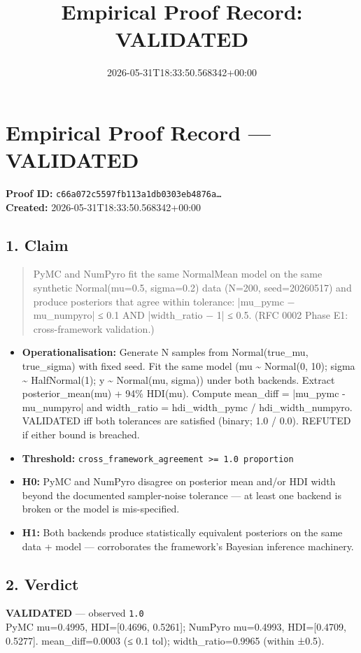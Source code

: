 \documentclass{article}
\title{Empirical Proof Record: VALIDATED}
\date{2026-05-31T18:33:50.568342+00:00}
\begin{document}
\maketitle
\section*{Empirical Proof Record --- \textcolor{validated}{\textbf{VALIDATED}}}
\textbf{Proof ID:} \texttt{c66a072c5597fb113a1db0303eb4876a\dots}\\
\textbf{Created:} 2026-05-31T18:33:50.568342+00:00
\subsection*{1. Claim}
\begin{quote}PyMC and NumPyro fit the same NormalMean model on the same synthetic Normal(mu=0.5, sigma=0.2) data (N=200, seed=20260517) and produce posteriors that agree within tolerance: |mu\_pymc − mu\_numpyro| ≤ 0.1 AND |width\_ratio − 1| ≤ 0.5. (RFC 0002 Phase E1: cross-framework validation.)\end{quote}
\begin{itemize}
\item \textbf{Operationalisation:} Generate N samples from Normal(true\_mu, true\_sigma) with fixed seed. Fit the same model (mu \textasciitilde{} Normal(0, 10); sigma \textasciitilde{} HalfNormal(1); y \textasciitilde{} Normal(mu, sigma)) under both backends. Extract posterior\_mean(mu) + 94\% HDI(mu). Compute mean\_diff = |mu\_pymc - mu\_numpyro| and width\_ratio = hdi\_width\_pymc / hdi\_width\_numpyro. VALIDATED iff both tolerances are satisfied (binary; 1.0 / 0.0). REFUTED if either bound is breached.
\item \textbf{Threshold:} \texttt{cross\_framework\_agreement >= 1.0 proportion}
\item \textbf{H0:} PyMC and NumPyro disagree on posterior mean and/or HDI width beyond the documented sampler-noise tolerance — at least one backend is broken or the model is mis-specified.
\item \textbf{H1:} Both backends produce statistically equivalent posteriors on the same data + model — corroborates the framework's Bayesian inference machinery.
\end{itemize}
\subsection*{2. Verdict}
\textcolor{validated}{\textbf{VALIDATED}} --- observed \texttt{1.0}\\
PyMC mu=0.4995, HDI=[0.4696, 0.5261]; NumPyro mu=0.4993, HDI=[0.4709, 0.5277]. mean\_diff=0.0003 (≤ 0.1 tol); width\_ratio=0.9965 (within ±0.5).
\end{document}
